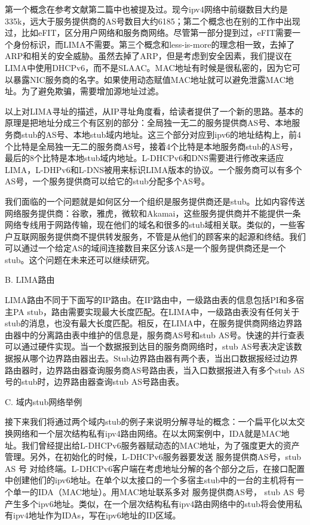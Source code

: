 \par 第一个概念在参考文献第二篇中也被提及过。现今ipv4网络中前缀数目大约是335k，远大于服务提供商的AS号数目大约6185；第二个概念也在别的工作中出现过，比如eFIT，区分用户网络和服务商网络。尽管第一部分提到过，eFIT需要一个身份标识，而LIMA不需要。第三个概念和less-is-more的理念相一致，去掉了ARP和相关的安全威胁。虽然去掉了ARP，但是考虑到安全因素，我们提议在LIMA中使用DHCPv6，而不是SLAAC。MAC地址有时候是很私密的，因为它可以暴露NIC服务商的名字。如果使用动态赋值MAC地址就可以避免泄露MAC地址。为了避免欺骗，需要增加源地址过滤。
\par 以上对LIMA寻址的描述，从IP寻址角度看，给读者提供了一个新的思路。基本的原理是把地址分成三个有区别的部分：全局独一无二的服务提供商AS号、本地服务商stub的AS号、本地stub域内地址。这三个部分对应到ipv6的地址结构上，前4个比特是全局独一无二的服务商AS号，接着4个比特是本地服务商stub的AS号，最后的8个比特是本地stub域内地址。L-DHCPv6和DNS需要进行修改来适应LIMA，L-DHPv6和L-DNS被用来标识LIMA版本的协议。一个服务商可以有多个AS号，一个服务提供商可以给它的stub分配多个AS号。
\par 我们面临的一个问题就是如何区分一个组织是服务提供商还是stub。比如内容传送网络服务提供商：谷歌，雅虎，微软和Akamai，这些服务提供商并不能提供一条网络专线用于网路传输，现在他们的域名和很多的stub域相关联。类似的，一些客户互联网服务提供商不提供转发服务，不管是从他们的顾客来的起源和终结。我们可以通过一个给定AS的域间连接数目来区分该AS是一个服务提供商还是一个stub。这个问题在未来还可以继续研究。
\begin{flushleft}
B.	LIMA路由
\end{flushleft}
\par LIMA路由不同于下面写的IP路由。在IP路由中，一级路由表的信息包括PI和多宿主PA stub，路由需要实现最大长度匹配。在LIMA中，一级路由表没有任何关于stub的消息，也没有最大长度匹配。相反，在LIMA中，在服务提供商网络边界路由器中的分离路由表中维护的信息是，服务商AS号和stub AS号。快速的并行查表可以通过硬件实现。当一个数据报到达目的服务商网络时，stub AS号表决定该数据报从哪个边界路由器出去。Stub边界路由器有两个表，当出口数据报经过边界路由器时，边界路由器查询服务商AS号路由表，当入口数据报进入有多个stub AS号的stub时，边界路由器查询stub AS号路由表。
\begin{flushleft}
C.	域内stub网络举例
\end{flushleft}
\par 接下来我们将通过两个域内stub的例子来说明分解寻址的概念：一个扁平化以太交换网络和一个层次结构私有ipv4路由网络。在以太网案例中，IDA就是MAC地址。我们曾经提出给L-DHCPv6服务器赋动态的MAC地址，为了强度更大的资产管理。另外，在初始化的时候，L-DHCPv6服务器要发送 { 服务提供商AS号，stub AS 号 } 对给终端。L-DHCPv6客户端在考虑地址分解的各个部分之后，在接口配置中创建他们的ipv6地址。在单个以太接口的一个多宿主stub中的一台的主机将有一个单一的IDA（MAC地址）。用MAC地址联系多对 { 服务提供商AS号， stub AS 号}产生多个ipv6地址。类似，在一个层次结构私有ipv4路由网络中的stub将会使用私有ipv4地址作为IDAs，写在ipv6地址的ID区域。
